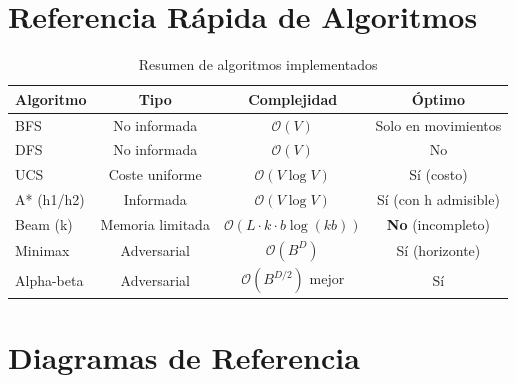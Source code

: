 \chapter{Referencia Rápida de Algoritmos}
\label{ap:algoritmos}
\begin{table}[H]
\centering
\caption{Resumen de algoritmos implementados}
\begin{tabular}{lccc}
\toprule
Algoritmo & Tipo & Complejidad & Óptimo \\
\midrule
BFS & No informada & $\mathcal{O}(V)$ & Solo en movimientos \\
DFS & No informada & $\mathcal{O}(V)$ & No \\
UCS & Coste uniforme & $\mathcal{O}(V \log V)$ & Sí (costo) \\
A* (h1/h2) & Informada & $\mathcal{O}(V \log V)$ & Sí (con h admisible) \\
Beam (k) & Memoria limitada & $\mathcal{O}(L \cdot k \cdot b \log(kb))$ & \textbf{No} (incompleto) \\
Minimax & Adversarial & $\mathcal{O}(B^D)$ & Sí (horizonte) \\
Alpha-beta & Adversarial & $\mathcal{O}(B^{D/2})$ mejor & Sí \\
\bottomrule
\end{tabular}
\end{table}

\chapter{Diagramas de Referencia}

